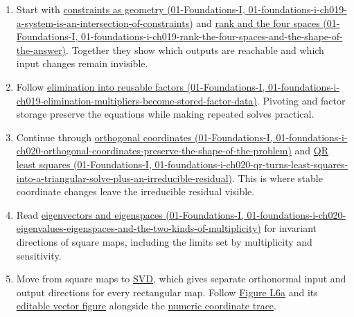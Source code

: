\begin{enumerate}
\def\labelenumi{\arabic{enumi}.}
\tightlist
\item
  Start with \href{../01-Foundations-I/main.pdf\#nameddest=01-foundations-i-ch019-a-system-is-an-intersection-of-constraints}{constraints as geometry (01-Foundations-I, 01-foundations-i-ch019-a-system-is-an-intersection-of-constraints)} and \href{../01-Foundations-I/main.pdf\#nameddest=01-foundations-i-ch019-rank-the-four-spaces-and-the-shape-of-the-answer}{rank and the four spaces (01-Foundations-I, 01-foundations-i-ch019-rank-the-four-spaces-and-the-shape-of-the-answer)}. Together they show which outputs are reachable and which input changes remain invisible.
\item
  Follow \href{../01-Foundations-I/main.pdf\#nameddest=01-foundations-i-ch019-elimination-multipliers-become-stored-factor-data}{elimination into reusable factors (01-Foundations-I, 01-foundations-i-ch019-elimination-multipliers-become-stored-factor-data)}. Pivoting and factor storage preserve the equations while making repeated solves practical.
\item
  Continue through \href{../01-Foundations-I/main.pdf\#nameddest=01-foundations-i-ch020-orthogonal-coordinates-preserve-the-shape-of-the-problem}{orthogonal coordinates (01-Foundations-I, 01-foundations-i-ch020-orthogonal-coordinates-preserve-the-shape-of-the-problem)} and \href{../01-Foundations-I/main.pdf\#nameddest=01-foundations-i-ch020-qr-turns-least-squares-into-a-triangular-solve-plus-an-irreducible-residual}{QR least squares (01-Foundations-I, 01-foundations-i-ch020-qr-turns-least-squares-into-a-triangular-solve-plus-an-irreducible-residual)}. This is where stable coordinate changes leave the irreducible residual visible.
\item
  Read \href{../01-Foundations-I/main.pdf\#nameddest=01-foundations-i-ch020-eigenvalues-eigenspaces-and-the-two-kinds-of-multiplicity}{eigenvectors and eigenspaces (01-Foundations-I, 01-foundations-i-ch020-eigenvalues-eigenspaces-and-the-two-kinds-of-multiplicity)} for invariant directions of square maps, including the limits set by multiplicity and sensitivity.
\item
  Move from square maps to \hyperref[02-foundations-ii-ch024-the-svd-equation-as-independent-input-output-channels]{SVD}, which gives separate orthonormal input and output directions for every rectangular map. Follow \hyperref[02-foundations-ii-ch024-figure-l6a---watch-the-same-directions-become-an-ellipse]{Figure L6a} and its \href{../current/Assets/Print/3491f9bdb1d7f300619c0d11a33ded7f3b3adfdc803929f353124f6903c784b4.svg}{editable vector figure} alongside the \hyperref[02-foundations-ii-ch024-a-concrete-rotation-stretch-and-coordinate-trace]{numeric coordinate trace}.

\end{enumerate}

